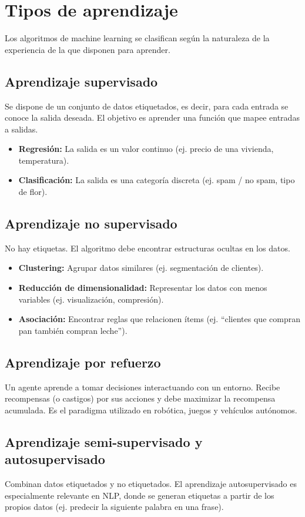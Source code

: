 \documentclass[12pt,a4paper,openany,oneside]{book}
\begin{document}
\section{Tipos de aprendizaje}
Los algoritmos de machine learning se clasifican según la naturaleza de la experiencia de la que disponen para aprender.

\subsection{Aprendizaje supervisado}
Se dispone de un conjunto de datos etiquetados, es decir, para cada entrada se conoce la salida deseada. El objetivo es aprender una función que mapee entradas a salidas.
\begin{itemize}
    \item \textbf{Regresión:} La salida es un valor continuo (ej. precio de una vivienda, temperatura).
    \item \textbf{Clasificación:} La salida es una categoría discreta (ej. spam / no spam, tipo de flor).
\end{itemize}

\subsection{Aprendizaje no supervisado}
No hay etiquetas. El algoritmo debe encontrar estructuras ocultas en los datos.
\begin{itemize}
    \item \textbf{Clustering:} Agrupar datos similares (ej. segmentación de clientes).
    \item \textbf{Reducción de dimensionalidad:} Representar los datos con menos variables (ej. visualización, compresión).
    \item \textbf{Asociación:} Encontrar reglas que relacionen ítems (ej. ``clientes que compran pan también compran leche'').
\end{itemize}

\subsection{Aprendizaje por refuerzo}
Un agente aprende a tomar decisiones interactuando con un entorno. Recibe recompensas (o castigos) por sus acciones y debe maximizar la recompensa acumulada. Es el paradigma utilizado en robótica, juegos y vehículos autónomos.

\subsection{Aprendizaje semi-supervisado y autosupervisado}
Combinan datos etiquetados y no etiquetados. El aprendizaje autosupervisado es especialmente relevante en NLP, donde se generan etiquetas a partir de los propios datos (ej. predecir la siguiente palabra en una frase).
\end{document}
